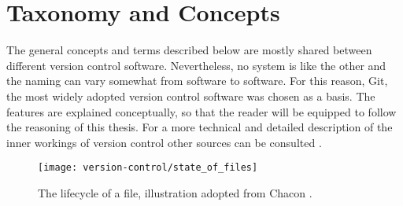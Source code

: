 \section{Taxonomy and Concepts}
The general concepts and terms described below are mostly shared between different version control software. Nevertheless, no system is like the other and the naming can vary somewhat from software to software. For this reason, Git, the most widely adopted version control software \cite{_stack_2015} was chosen as a basis. The features are explained conceptually, so that the reader will be equipped to follow the reasoning of this thesis. For a more technical and detailed description of the inner workings of version control other sources can be consulted \cite{baudis_current_2009,chacon_pro_2009,pilato_version_2008}.

\begin{figure}
 \centering
 \texttt{[image: version-control/state\_of\_files]}
 \caption{The lifecycle of a file, illustration adopted from Chacon \cite[p.~45]{chacon_pro_2009}.}
 \label{fig:file-state}
\end{figure}


